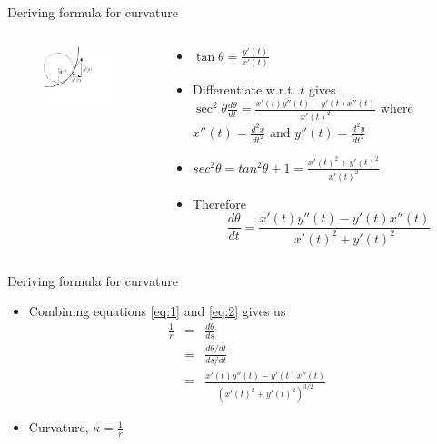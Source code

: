 \documentclass{beamer}
\begin{document}
\begin{frame}{Deriving formula for curvature}
	\begin{columns}
		\begin{column}{0.35\textwidth}			
			\begin{figure}
				\centering
				\includegraphics[width=60mm, scale=0.65]{curvature_illustration_2.png}
			\end{figure}
		\end{column}
		\begin{column}{0.75\textwidth}			

			\begin{itemize}
				\item $\tan \theta = \frac{y'(t)}{x'(t)}$ 
				\item Differentiate w.r.t. $t$ gives $\sec ^2 \theta \frac{d\theta}{dt} = \frac{x'(t) y''(t) - y'(t) x''(t)}{x'(t)^2}$
				where $x''(t)=\frac{d^2 x}{dt^2}$ and $y''(t)=\frac{d^2 y}{dt^2}$
				\item $sec^2\theta = tan^2\theta +1 = \frac{{x'(t)^2+y'(t)^2}}{x'(t)^2}$ 
				\item Therefore
				\begin{equation} \label{eq:2}
				\frac{d\theta}{dt}=\frac{x'(t) y''(t) - y'(t) x''(t)}{x'(t)^2+y'(t)^2}
				\end{equation}

			\end{itemize}
	\end{column}
\end{columns}
\end{frame}

\begin{frame}{Deriving formula for curvature}
	\begin{itemize}
		\item Combining equations \ref{eq:1} and \ref{eq:2} gives us
		\begin{eqnarray*}
			\frac1r &=& \frac{d\theta}{ds} \\
					&=& \frac{d\theta/dt}{ds/dt}  \\
			        &=& \frac{x'(t) y''(t) - y'(t) x''(t)}{\left(x'(t)^2 + y'(t)^2 \right)^{3/2}}
		\end{eqnarray*}
		
		\item Curvature, $\kappa = \frac1r$
	\end{itemize}
	
\end{frame}
\end{document}
